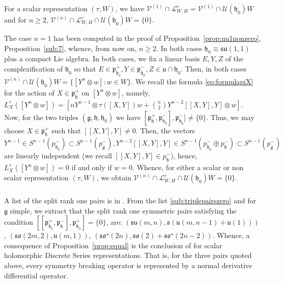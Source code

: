 \documentclass[12pt]{amsart}
\theoremstyle{definition}
\theoremstyle{remark}
\newcommand{\g}{\mathfrak{g}}
\newcommand{\h}{\mathfrak{h}}
\newcommand{\p}{\mathfrak p}
\numberwithin{equation}{section}
\begin{document}
For a scalar representation $(\tau,W)$, we have $\mathcal V^{(1)}\cap \mathcal L_{W,H}^c = \mathcal V^{(1)}\cap \mathcal U(\h_0)W$ and for $n\geq 2$,   $\mathcal V^{(n)}\cap \mathcal L_{W,H}^c \cap \mathcal U(\h_0)W= \{0\}$.


 The case $n=1$ has been computed in the proof of Proposition~\ref{prop:nu1nonzero}, Proposition~\ref{sub:7}, whence, from now on, $n\geq 2$. In both cases $\h_0 \equiv \mathfrak{su}(1,1)$ plus a compact Lie algebra. In both cases, we fix a linear basis $E,Y,Z$ of the complexification of $\h_0$ so that  $ E \in \p_{\h_0}^+, Y \in \p_{\h_0}^-, Z \in \mathfrak u \cap \h_0$. Then, in both cases $\mathcal V^{(n)}  \cap \mathcal U(\h_0)W=\{ [Y^n \otimes w] : w \in W \}$. We recall the formula \ref{eq:formulapiX}  for the action of $X \in \p_{\h}^+$ on $[Y^n \otimes w]$, namely, $L_X^\tau ([Y^n \otimes w])=[n Y^{n-1} \otimes \tau([X,Y])w +\binom{n}{2}Y^{n-2} [[X,Y],Y]\otimes w]$. Now, for the two triples $(\g,\h,\h_0)$ we have $[\p_\h^+, \p_{\h_0}^-], \p_{\h_0}^-] \not=\{0 \}$. Thus, we may choose $X \in \p_\h^+$ such that $[[X,Y],Y]\not= 0$. Then, the vectors $Y^{n-1} \in S^{n-1}(p_{\h_0}^-) \subset S^{n-1}(p_{\g}^-)   ,  Y^{n-2}[[X,Y],Y] \in S^{n-1}(p_{\h_0}^- \oplus p_{\h}^- ) \subset S^{n-1}(p_{\g}^-) $  are linearly independent (we recall $[[X,Y],Y] \in p_{\h}^-$), hence,  $L_X^\tau ([Y^n \otimes w])=0$ if and only if $w=0$.  Whence, for either a scalar or non scalar representation $(\tau,W)$, we obtain   $\mathcal V^{(n)}\cap \mathcal L_{W,H}^c \cap \mathcal U(\h_0)W=\{0\}$.
 \subsubsection{} A list of the split rank  one  pairs is in \cite[Table 2]{KP2}.
From the   list \ref{sub:triplepairszero}  and for $\g$ simple, we extract that the split rank
one symmetric pairs     satisfying the condition
$[[ \p_{\h_0}^+,\p_\h^- ],\p_{\h_0}^+]=\{0\}$, are:
$(\mathfrak{su}(m,n), \mathfrak s(\mathfrak{u} (m,n-1) + \mathfrak u(1)))$,
$(\mathfrak{so}(2m,2), \mathfrak u(m,1))$,    $(\mathfrak{so}^\star(2n),
\mathfrak{so}(2) +\mathfrak{so}^\star(2n-2)) $.
Whence, a consequence of Proposition~\ref{prop:equal}
is the conclusion of \cite[Theorem 5.3]{KP2} for scalar holomorphic Discrete
 Series representations.    That is,   for the three pairs quoted above, every symmetry breaking operator
is represented by a normal derivative differential operator.
\end{document}
